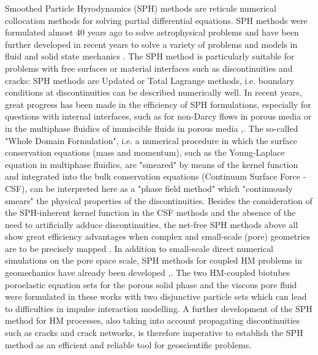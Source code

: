 Smoothed Particle Hyrodynamics (SPH) methods are reticule numerical collocation methods for solving partial differential equations. SPH methods were formulated almost 40 years ago to solve astrophysical problems and have been further developed in recent years to solve a variety of problems and models in fluid and solid state mechanics \cite{Monaghan2011323}. The SPH method is particularly suitable for problems with free surfaces or material interfaces such as discontinuities and cracks: SPH methods are Updated or Total Lagrange methods, i.e. boundary conditions at discontinuities can be described numerically well. In recent years, great progress has been made in the efficiency of SPH formulations, especially for questions with internal interfaces, such as for non-Darcy flows in porous media or in the multiphase fluidics of immiscible fluids in porous media \cite{Morris2000333},\cite{Tartakovsky2005610}. The so-called "Whole Domain Formulation", i.e. a numerical procedure in which the surface conservation equations (mass and momentum), such as the Young-Laplace equation in multiphase fluidics, are "smeared" by means of the kernel function and integrated into the bulk conservation equations (Continuum Surface Force - CSF), can be interpreted here as a "phase field method" which "continuously smears" the physical properties of the discontinuities. Besides the consideration of the SPH-inherent kernel function in the CSF methods and the absence of the need to artificially adduce discontinuities, the net-free SPH methods above all show great efficiency advantages when complex and small-scale (pore) geometries are to be precisely mapped \cite{Sivanesapillai2016212}. In addition to small-scale direct numerical simulations on the pore space scale, SPH methods for coupled HM problems in geomechanics have already been developed \cite{Bui2007339},\cite{Bui20141321}. The two HM-coupled biotubes poroelastic equation sets for the porous solid phase and the viscous pore fluid were formulated in these works with two disjunctive particle sets which can lead to difficulties in impulse interaction modelling. A further development of the SPH method for HM processes, also taking into account propagating discontinuities such as cracks and crack networks, is therefore imperative to establish the SPH method as an efficient and reliable tool for geoscientific problems.

